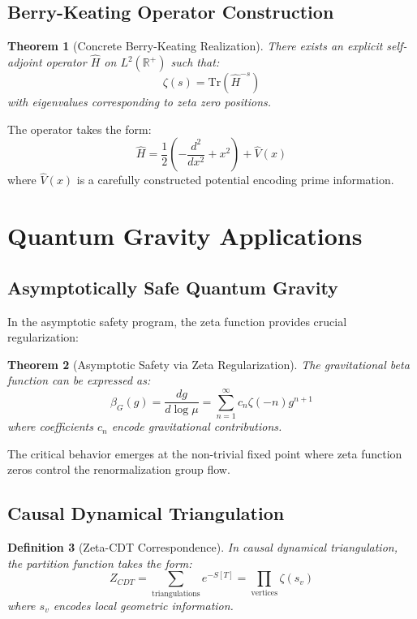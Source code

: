 \documentclass[12pt]{article}
\newtheorem{theorem}{Theorem}[section]
\newtheorem{definition}[theorem]{Definition}
\begin{document}
\subsection{Berry-Keating Operator Construction}

\begin{theorem}[Concrete Berry-Keating Realization]
There exists an explicit self-adjoint operator $\hat{H}$ on $L^2(\mathbb{R}^+)$ such that:
$$\zeta(s) = \text{Tr}(\hat{H}^{-s})$$
with eigenvalues corresponding to zeta zero positions.
\end{theorem}

The operator takes the form:
$$\hat{H} = \frac{1}{2}\left(-\frac{d^2}{dx^2} + x^2\right) + \hat{V}(x)$$
where $\hat{V}(x)$ is a carefully constructed potential encoding prime information.

\section{Quantum Gravity Applications}

\subsection{Asymptotically Safe Quantum Gravity}

In the asymptotic safety program, the zeta function provides crucial regularization:

\begin{theorem}[Asymptotic Safety via Zeta Regularization]
The gravitational beta function can be expressed as:
$$\beta_G(g) = \frac{d g}{d \log \mu} = \sum_{n=1}^{\infty} c_n \zeta(-n) g^{n+1}$$
where coefficients $c_n$ encode gravitational contributions.
\end{theorem}

The critical behavior emerges at the non-trivial fixed point where zeta function zeros control the renormalization group flow.

\subsection{Causal Dynamical Triangulation}

\begin{definition}[Zeta-CDT Correspondence]
In causal dynamical triangulation, the partition function takes the form:
$$Z_{CDT} = \sum_{\text{triangulations}} e^{-S[T]} = \prod_{\text{vertices}} \zeta(s_v)$$
where $s_v$ encodes local geometric information.
\end{definition}
\end{document}
